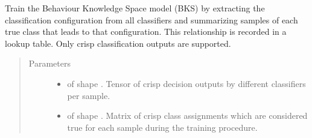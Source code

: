 \documentclass[letterpaper,10pt,english]{sphinxmanual}
\begin{document}
\begin{fulllineitems}
\begin{fulllineitems}
\label{\detokenize{pusion.core.behaviour_knowledge_space_combiner:pusion.core.behaviour_knowledge_space_combiner.BehaviourKnowledgeSpaceCombiner.train}}
\sphinxAtStartPar
Train the Behaviour Knowledge Space model (BKS) by extracting the classification configuration from all
classifiers and summarizing samples of each true class that leads to that configuration. This relationship is
recorded in a lookup table. Only crisp classification outputs are supported.
\begin{quote}\begin{description}
\item[{Parameters}] \leavevmode\begin{itemize}
\item {} 
\sphinxAtStartPar
{} \textendash{}  of shape .
Tensor of crisp decision outputs by different classifiers per sample.

\item {} 
\sphinxAtStartPar
{} \textendash{}  of shape .
Matrix of crisp class assignments which are considered true for each sample during
the training procedure.

\end{itemize}

\end{description}\end{quote}

\end{fulllineitems}



\end{fulllineitems}
\end{document}
